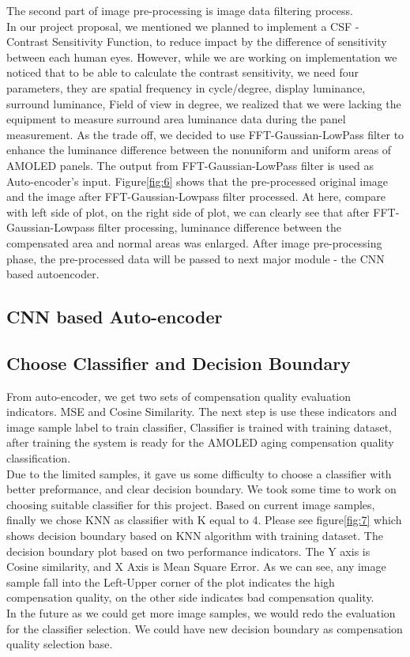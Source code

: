 \documentclass[runningheads]{llncs}
\begin{document}
The second part of image pre-processing is image data filtering process. \\
In our project proposal, we mentioned we planned to implement a CSF - Contrast Sensitivity Function, to reduce impact by the difference of sensitivity between each human eyes. However, while we are working on implementation we noticed that to be able to calculate the contrast sensitivity, we need four parameters, they are spatial frequency in cycle/degree, display luminance, surround luminance, Field of view in degree, we realized that we were lacking the equipment to measure surround area luminance data during the panel measurement. As the trade off, we decided to use FFT-Gaussian-LowPass filter to enhance the luminance difference between the nonuniform and uniform areas of AMOLED panels. The output from FFT-Gaussian-LowPass filter is used as Auto-encoder's input. Figure\ref{fig:6} shows that the pre-processed original image and the image after FFT-Gaussian-Lowpass filter processed. At here, compare with left side of plot, on the right side of plot, we can clearly see that after FFT-Gaussian-Lowpass filter processing, luminance difference between the compensated area and normal areas was enlarged.
After image pre-processing phase, the pre-processed data will be passed to next major module - the CNN based autoencoder. 
\subsection{CNN based Auto-encoder}

\subsection{Choose Classifier and Decision Boundary}
From auto-encoder, we get two sets of compensation quality evaluation indicators. MSE and Cosine Similarity. The next step is use these indicators and image sample label to train classifier, Classifier is trained with training dataset, after training the system is ready for the AMOLED aging compensation quality classification.\\
Due to the limited samples, it gave us some difficulty to choose a classifier with better preformance, and clear decision boundary. We took some time to work on choosing suitable classifier for this project. Based on current image samples, finally we chose KNN as classifier with K equal to 4. Please see figure\ref{fig:7} which shows decision boundary based on KNN algorithm with training dataset. The decision boundary plot based on two performance indicators. The Y axis is Cosine similarity, and X Axis is Mean Square Error. As we can see, any image sample fall into the Left-Upper corner of the plot indicates the high compensation quality, on the other side indicates bad compensation quality.\\
In the future as we could get more image samples, we would redo the evaluation for the classifier selection. We could have new decision boundary as compensation quality selection base.
 
\end{document}
